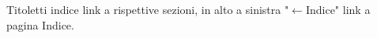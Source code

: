 \documentclass[12pt]{article}
\begin{document}
	\maketitle\thispagestyle{empty}
	\begin{center}
		\tiny Titoletti indice link a rispettive sezioni, in alto a sinistra "$\leftarrow$Indice" link a pagina Indice.
	\end{center}
	\tableofcontents\label{toc}
	
	
	
	
\end{document}
